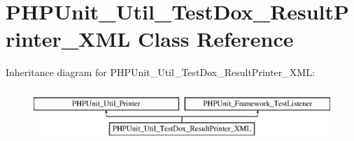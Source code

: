 \hypertarget{class_p_h_p_unit___util___test_dox___result_printer___x_m_l}{}\section{P\+H\+P\+Unit\+\_\+\+Util\+\_\+\+Test\+Dox\+\_\+\+Result\+Printer\+\_\+\+X\+ML Class Reference}
\label{class_p_h_p_unit___util___test_dox___result_printer___x_m_l}
Inheritance diagram for P\+H\+P\+Unit\+\_\+\+Util\+\_\+\+Test\+Dox\+\_\+\+Result\+Printer\+\_\+\+X\+ML\+:\begin{figure}[H]
\begin{center}
\leavevmode
\includegraphics[height=2.000000cm]{class_p_h_p_unit___util___test_dox___result_printer___x_m_l}
\end{center}
\end{figure}

